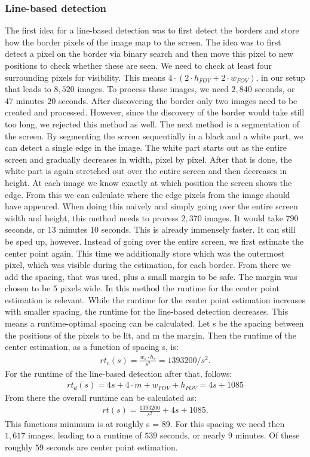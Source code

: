 \documentclass[journal,final,a4paper,twoside]{PS}
\begin{document}
\subsubsection{Line-based detection} 
\label{sec:linebased}
The first idea for a line-based detection was to first detect the borders and store how the border pixels of the image map to the screen. The idea was to first detect a pixel on the border via binary search and then move this pixel to new positions to check whether these are seen. We need to check at least four surrounding pixels for visibility. This means $4 \cdot (2 \cdot h_{FOV} + 2 \cdot w_{FOV})$, in our setup that leads to $8,520$ images. To process these images, we need $2,840$ seconds, or $47$ minutes $20$ seconds. After discovering the border only two images need to be created and processed. However, since the discovery of the border would take still too long, we rejected this method as well.
The next method is a segmentation of the screen. By segmenting the screen sequentially in a black and a white part, we can detect a single edge in the image. The white part starts out as the entire screen and gradually decreases in width, pixel by pixel. After that is done, the white part is again stretched out over the entire screen and then decreases in height. At each image we know exactly at which position the screen shows the edge. From this we can calculate where the edge pixels from the image should have appeared.
When doing this naively and simply going over the entire screen width and height, this method needs to process $2,370$ images. It would take $790$ seconds, or $13$ minutes $10$ seconds. This is already immensely faster. It can still be sped up, however.
Instead of going over the entire screen, we first estimate the center point again. This time we additionally store which was the outermost pixel, which was visible during the estimation, for each border. From there we add the spacing, that was used, plus a small margin to be safe. The margin was chosen to be $5$ pixels wide. In this method the runtime for the center point estimation is relevant. While the runtime for the center point estimation increases with smaller spacing, the runtime for the line-based detection decreases. This means a runtime-optimal spacing can be calculated.
Let s be the spacing between the positions of the pixels to be lit, and m the margin. Then the runtime of the center estimation, as a function of spacing s, is:
\begin{align}
rt_c (s) = \frac{w_s\cdot h_s}{ s^2} = 1393200 / s^2.
\end{align}
For the runtime of the line-based detection after that, follows:
\begin{align}
rt_d (s) = 4s + 4\cdot m + w_{FOV} + h_{FOV} = 4s + 1085
\end{align}
From there the overall runtime can be calculated as:
\begin{align}
rt(s) = \frac{1393200}{s^2} + 4s +1085.
\end{align}
This functions minimum is at roughly s = 89. For this spacing we need then $1,617$ images, leading to a runtime of $539$ seconds, or nearly $9$ minutes. Of these roughly $59$ seconds are center point estimation.
\end{document}
